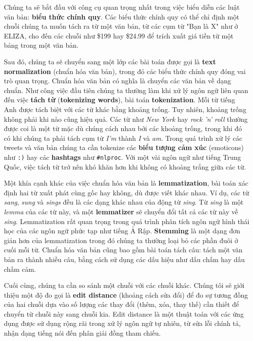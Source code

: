 Chúng ta sẽ bắt đầu với công cụ quan trọng nhất trong việc biểu diễn các luật văn bản: \textbf{biểu thức chính quy}. Các biểu thức chính quy có thể chỉ định một chuỗi chúng ta muốn tách ra từ một văn bản, từ các cụm từ "Bạn là X" như ở ELIZA, cho đến các chuỗi như \$199 hay \$24.99 để trích xuất giá tiền từ một bảng trong một văn bản.

Sau đó, chúng ta sẽ chuyển sang một lớp các bài toán được gọi là \textbf{text normalization} (chuẩn hóa văn bản), trong đó các biểu thức chính quy đóng vai trò quan trọng. Chuẩn hóa văn bản có nghĩa là chuyển các văn bản về dạng chuẩn. Như công việc đầu tiên chúng ta thường làm khi xử lý ngôn ngữ liên quan đến việc \textbf{tách từ} (\textbf{tokenizing words}), bài toán \textbf{tokenization}. Mỗi từ tiếng Anh được tách biệt với các từ khác bằng khoảng trống. Tuy nhiên, khoảng trống không phải khi nào cũng hiệu quả. Các từ như \textit{New York} hay \textit{rock 'n' roll} thường được coi là một từ mặc dù chúng cách nhau bởi các khoảng trống, trong khi đó có khi chúng ta phải tách cụm từ \textit{I'm} thành \textit{I} và \textit{am}. Trong quá trình xử lý các tweets và văn bản chúng ta cần tokenize các \textbf{biểu tượng cảm xúc} (emoticons) như \verb|:)| hay các \textbf{hashtags} như \verb|#nlproc|. Với một vài ngôn ngữ như tiếng Trung Quốc, việc tách từ trở nên khó khăn hơn khi không có khoảng trắng giữa các từ.

Một khía cạnh khác của việc chuẩn hóa văn bản là \textbf{lemmatization}, bài toán xác định hai từ xuất phát cùng gốc hay không, dù được viết khác nhau. Ví dụ, các từ \textit{sang}, \textit{sung} và \textit{sings} đều là các dạng khác nhau của động từ \textit{sing}. Từ \textit{sing} là một \textit{lemma} của các từ này, và một \textbf{lemmatizer} sẽ chuyển đổi tất cả các từ này về \textit{sing}. Lemmatization rất quan trọng trong quá trình phân tích ngôn ngữ hình thái học của các ngôn ngữ phức tạp như tiếng Ả Rập. \textbf{Stemming} là một dạng đơn giản hơn của lemmatization trong đó chúng ta thường loại bỏ các phần đuôi ở cuối mỗi từ. Chuẩn hóa văn bản cũng bao gồm bài toán tách câu: tách một văn bản ra thành nhiều câu, bằng cách sử dụng các dấu hiệu như dấu chấm hay dấu chấm cảm.

Cuối cùng, chúng ta cần so sánh một chuỗi với các chuỗi khác. Chúng tôi sẽ giới thiệu một độ đo gọi là \textbf{edit distance} (khoảng cách sửa đổi) để đo sự tương đồng của hai chuỗi dựa vào số lượng các thay đổi (thêm, xóa, thay thế) cần thiết để chuyển từ chuỗi này sang chuỗi kia. Edit distance là một thuật toán với các ứng dụng được sử dụng rộng rãi trong xử lý ngôn ngữ tự nhiên, từ sửa lỗi chính tả, nhận dạng tiếng nói đến phân giải đồng tham chiếu.

